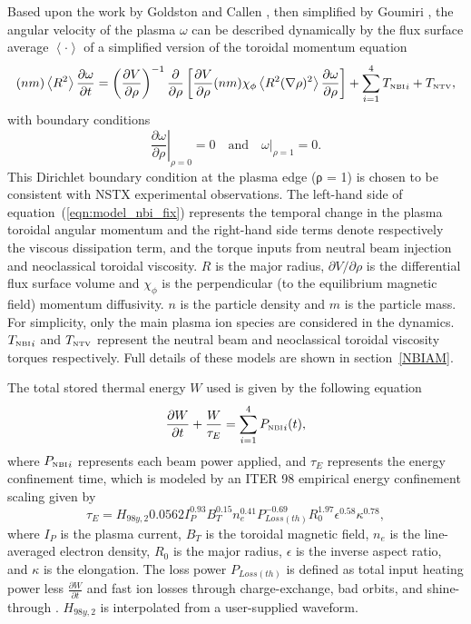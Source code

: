 \documentclass[12pt,lot, lof]{puthesis}
\begin{document}
Based upon the work by Goldston \cite{Goldston86}  and Callen  \cite{Callen09}, then simplified by Goumiri \cite{Goumiri15}, the angular velocity of the plasma $\omega$ can be described dynamically by the flux surface average $\left<\cdot\right>$ of a simplified version of the toroidal momentum equation 
\begin{equation}
  (n m) \left<R^2\right>
 \frac{\partial \omega}{\partial t}
 = \left( \frac{\partial V}{\partial\rho}\right)^{-1}
   \frac{\partial}{\partial \rho} 
   \left[\frac{\partial V}{\partial \rho} (n m) \chi_\phi 
   \left< R^2 (\nabla \rho)^2\right> 
   \frac{\partial\omega}{\partial\rho}\right]
   + \sum _ {i=1}^{4}  {T_\textrm{\tiny NBI}}_i + T_\textrm{\tiny NTV}, 
\label{eqn:model_nbi_fix}
\end{equation}
with boundary conditions
\begin{equation}
\left.\frac{\partial\omega}{\partial\rho}\right|_{\rho=0} = 0 
\quad \text{and} \quad 
\left.\omega\right|_{\rho=1} = 0.
\label{bc0}
\end{equation}
This Dirichlet boundary condition at the plasma edge (ρ = 1) is chosen to be consistent with NSTX experimental observations.
The left-hand side of equation~(\ref{eqn:model_nbi_fix}) represents the temporal change in the plasma toroidal angular momentum and the right-hand side terms denote respectively the viscous dissipation term, and the torque inputs from neutral beam injection and neoclassical toroidal viscosity. $R$ is the major radius, $\partial V/\partial\rho$ is the differential flux surface volume and $\chi_\phi$ is the perpendicular (to the equilibrium magnetic field) momentum diffusivity. $n$ is the particle density and $m$ is the particle mass. For simplicity, only the main plasma ion species are considered in the dynamics.
${T_\textrm{\tiny NBI}}_i $ and $T_\textrm{\tiny NTV}$ represent the neutral beam and neoclassical toroidal viscosity torques respectively. Full details of these models are shown in section~\ref{NBIAM}.

The total stored thermal energy $W$ used is given by the following equation
\begin{equation}
\frac{\partial W}{\partial t}
   + \frac{W}{\tau_E}  =\sum_{i=1}^{4}{P_\textrm{\tiny{NBI}}}_i(t),
\label{energy}
\end{equation}
where ${P_\textrm{\tiny{NBI}}}_i$ represents each beam power applied, and ${\tau_E} $ represents the energy confinement time, which is modeled by an ITER 98 empirical energy confinement scaling \cite{Iter99} given by
\begin{equation}
\tau_E = H_{98y,2} 0.0562 I_{P}^{0.93} B_{T}^{0.15} n_{e}^{0.41} P_{Loss(th)}^{-0.69} R_{0}^{1.97} {\epsilon}^{0.58} \kappa^{0.78},
\end{equation}
where $I_P$ is the plasma current, $B_T$ is the toroidal magnetic field, $n_e$ is the line-averaged electron density, $R_0$ is the major radius, $\epsilon$ is the inverse aspect ratio, and $\kappa$ is the elongation. The loss power $P_{Loss(th)}$ is defined as total input heating power less $\frac{\partial W}{\partial t}$ and fast ion losses through charge-exchange, bad orbits, and shine-through \cite{Kaye06}.
$H_{98y,2} $ is interpolated from a user-supplied waveform.
\end{document}
